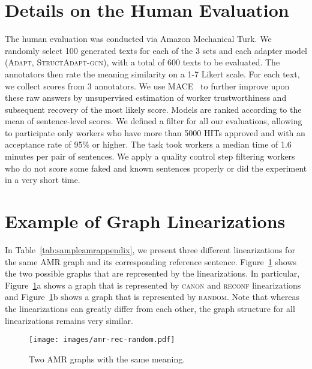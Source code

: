 \documentclass[11pt]{article}
\newcommand{\graphadaptergcn}{{\small\textsc{StructAdapt-gcn}}\xspace}
\newcommand{\vanilladapter}{{\small\textsc{Adapt}}\xspace}
\begin{document}
\section{Details on the Human Evaluation}
\label{appe:humaneval}
The human evaluation was conducted via Amazon Mechanical Turk. We randomly select 100 generated texts for each of the 3 sets and each adapter model (\vanilladapter, \graphadaptergcn), with a total of 600 texts to be evaluated. The annotators then rate the meaning similarity on a 1-7 Likert scale. For each text, we collect scores from 3 annotators. We use MACE~\cite{hovy-etal-2013-learning} to further improve upon these raw answers by unsupervised estimation of worker trustworthiness and subsequent recovery of the most likely score. Models are ranked according to the mean of sentence-level scores. We defined a filter for all our evaluations, allowing to participate only workers who have more than 5000 HITs approved and with an acceptance rate of 95\% or higher. The task took workers a median time of 1.6 minutes per pair of sentences. We apply a quality control step filtering workers who do not score some faked and known sentences properly or did the experiment in a very short time. 

\section{Example of Graph Linearizations}
\label{appe:exgraphline}

In Table~\ref{tab:sampleamrappendix}, we present three different linearizations for the same AMR graph and its corresponding reference sentence. Figure~\ref{fig:amrexamplesappendix} shows the two possible graphs that are represented by the linearizations. In particular, Figure~\ref{fig:amrexamplesappendix}a shows a graph that is represented by {\small\textsc{canon}} and {\small\textsc{reconf}} linearizations and Figure~\ref{fig:amrexamplesappendix}b shows a graph that is represented by {\small\textsc{random}}. Note that whereas the linearizations can greatly differ from each other, the graph structure for all linearizations remains very similar.

\begin{figure}[h]
    \centering
    \texttt{[image: images/amr-rec-random.pdf]}
    \caption{Two AMR graphs with the same meaning.}
    \label{fig:amrexamplesappendix}
    \vspace{-4mm}
\end{figure}
\end{document}
